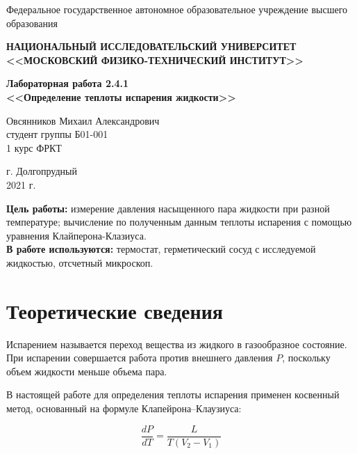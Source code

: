 \documentclass[a4paper,12pt]{article} %
\begin{document}
	\begin{center}
		
		\normalsize{Федеральное государственное автономное образовательное учреждение высшего образования}
		
		\textbf{НАЦИОНАЛЬНЫЙ ИССЛЕДОВАТЕЛЬСКИЙ УНИВЕРСИТЕТ \\ <<МОСКОВСКИЙ ФИЗИКО-ТЕХНИЧЕСКИЙ ИНСТИТУТ>>}
		\vspace{13ex}
		
		\textbf{Лабораторная работа 2.4.1 \\ <<Определение теплоты испарения жидкости>> }
		\vspace{40ex}
		
		\normalsize{Овсянников Михаил Александрович \\ студент группы Б01-001\\ 1 курс ФРКТ\\}
	\end{center}
	
	\vfill 
	
	\begin{center}
		г. Долгопрудный\\ 
		2021 г.
	\end{center}
	
	\thispagestyle{empty} %
	
	\newpage
	
	\textbf{Цель работы:} измерение давления насыщенного пара жидкости при разной температуре; вычисление по полученным данным теплоты испарения с помощью уравнения Клайперона-Клазиуса.\\
	
	\textbf{В работе используются:} термостат, герметический сосуд с исследуемой жидкостью, отсчетный микроскоп.\\ 
	
	\section*{Теоретические сведения}
	Испарением называется переход вещества из жидкого в газообразное состояние. При испарении совершается работа против внешнего давления $P$, поскольку объем жидкости меньше объема пара.
	
	\indent В настоящей работе для определения теплоты испарения применен косвенный метод, основанный на формуле Клапейрона–Клаузиуса:
	
	\begin{equation} \label{уравнение Клапейрона–Клаузиуса}
		\frac{dP}{dT} = \frac{L}{T(V_{2} - V_{1})}
	\end{equation}
	
\end{document}
